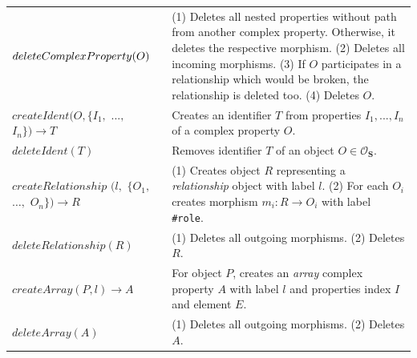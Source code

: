 \begin{table}[htp!]
\begin{tabular}{
    >{\raggedright\arraybackslash}p{35mm}%
    >{\raggedright\arraybackslash}p{84mm}%
    }
$deleteComplex\-Property(O)$  
    & (1) Deletes all nested properties without path from another complex property. Otherwise, it deletes the respective morphism. \newline (2) Deletes all incoming morphisms. \newline (3) If $O$ participates in a relationship which would be broken, the relationship is deleted too. \newline(4) Deletes $O$. 
    \\
$createIdent$\newline $(O, \{I_1,$ $...,$ $I_n\}) \rightarrow T$ 
    & Creates an identifier $T$ from properties $I_1, ..., I_n$ of a complex property $O$.
    \\
$deleteIdent(T)$ 
    & Removes identifier $T$ of an object $O \in \mathcal{O}_\mathbf{S}$.  
    \\
$createRelationship$ \newline $(l,$ $\{O_1,$ $\dots,$ $O_n\}) \rightarrow R$  
    &  (1) Creates object $R$ representing a \textit{relationship} object  with label $l$.
    \newline (2) For each $O_i$ creates morphism $m_i : R \rightarrow O_i$ with label \texttt{\#role}.    
    \\
$deleteRelationship(R)$ 
    & (1) Deletes all outgoing morphisms. \newline (2) Deletes $R$. 
    \\
$createArray(P, l) \rightarrow A$ 
    & For object $P$, creates an \textit{array} complex property $A$ with label $l$ and properties index $I$ and element $E$.
    \\
$deleteArray(A)$
    & (1) Deletes all outgoing morphisms. \newline (2) Deletes $A$.

\end{tabular}
\end{table}
